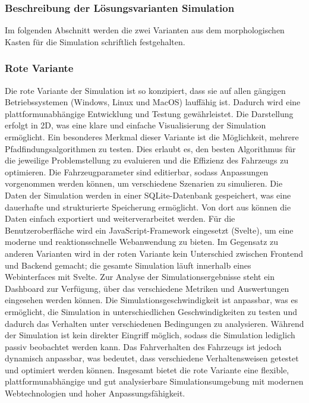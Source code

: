 \documentclass[main.tex]{subfiles} %
\begin{document}

\subsubsection{Beschreibung der Lösungsvarianten Simulation}
Im folgenden Abschnitt werden die zwei Varianten aus dem morphologischen Kasten für die Simulation
schriftlich festgehalten.

\subsubsection*{Rote Variante}
Die rote Variante der Simulation ist so konzipiert, dass sie auf allen gängigen Betriebssystemen (Windows, Linux und MacOS) lauffähig ist. 
Dadurch wird eine plattformunabhängige Entwicklung und Testung gewährleistet. Die Darstellung erfolgt in 2D, was eine klare und einfache 
Visualisierung der Simulation ermöglicht. Ein besonderes Merkmal dieser Variante ist die Möglichkeit, mehrere Pfadfindungsalgorithmen zu 
testen. Dies erlaubt es, den besten Algorithmus für die jeweilige Problemstellung zu evaluieren und die Effizienz des Fahrzeugs zu optimieren. 
Die Fahrzeugparameter sind editierbar, sodass Anpassungen vorgenommen werden können, um verschiedene Szenarien zu simulieren. Die Daten der 
Simulation werden in einer SQLite-Datenbank gespeichert, was eine dauerhafte und strukturierte Speicherung ermöglicht. Von dort aus können 
die Daten einfach exportiert und weiterverarbeitet werden. Für die Benutzeroberfläche wird ein JavaScript-Framework eingesetzt (Svelte), 
um eine moderne und reaktionsschnelle Webanwendung zu bieten. Im Gegensatz zu anderen Varianten wird in der roten Variante kein Unterschied 
zwischen Frontend und Backend gemacht; die gesamte Simulation läuft innerhalb eines Webinterfaces mit Svelte. Zur Analyse der Simulationsergebnisse 
steht ein Dashboard zur Verfügung, über das verschiedene Metriken und Auswertungen eingesehen werden können. Die Simulationsgeschwindigkeit 
ist anpassbar, was es ermöglicht, die Simulation in unterschiedlichen Geschwindigkeiten zu testen und dadurch das Verhalten unter verschiedenen 
Bedingungen zu analysieren. Während der Simulation ist kein direkter Eingriff möglich, sodass die Simulation lediglich passiv beobachtet werden 
kann. Das Fahrverhalten des Fahrzeugs ist jedoch dynamisch anpassbar, was bedeutet, dass verschiedene Verhaltensweisen getestet und optimiert 
werden können. Insgesamt bietet die rote Variante eine flexible, plattformunabhängige und gut analysierbare Simulationsumgebung mit modernen 
Webtechnologien und hoher Anpassungsfähigkeit.
\end{document}
